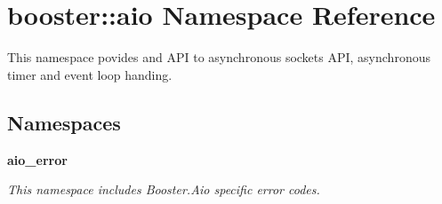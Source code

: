\section{booster\-:\-:aio Namespace Reference}
\label{namespacebooster_1_1aio}


This namespace povides and A\-P\-I to asynchronous sockets A\-P\-I, asynchronous timer and event loop handing.  


\subsection*{Namespaces}
\begin{DoxyCompactItemize}
\item 
{\bf aio\-\_\-error}
\begin{DoxyCompactList}\small\item\em This namespace includes Booster.\-Aio specific error codes. \end{DoxyCompactList}\end{DoxyCompactItemize}
